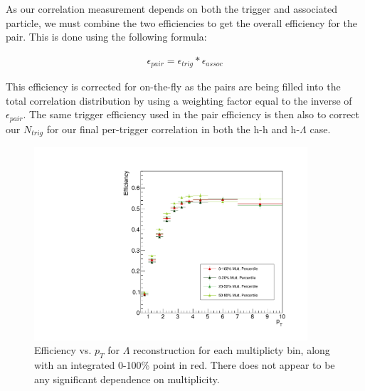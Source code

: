 \documentclass[ALICE,manyauthors]{ALICE_analysis_notes}
\begin{document}
As our correlation measurement depends on both the trigger and associated particle, we must combine the two efficiencies to get the overall efficiency for the pair.  This is done using the following formula:

\begin{align*}
    \epsilon_{pair} = \epsilon_{trig}*\epsilon_{assoc}
\end{align*}

This efficiency is corrected for on-the-fly as the pairs are being filled into the total correlation distribution by using a weighting factor equal to the inverse of $\epsilon_{pair}$. The same trigger efficiency used in the pair efficiency is then also to correct our $N_{trig}$ for our final per-trigger correlation in both the h-h and h-$\Lambda$ case.


\begin{figure}[ht]
\centering
\includegraphics[width=4in]{figures/v0_efficiency.pdf}
\caption{Efficiency vs. $p_T$ for $\Lambda$ reconstruction for each multiplicty bin, along with an integrated 0-100\% point in red. There does not appear to be any significant dependence on multiplicity.}
\label{lambda_eff}
\end{figure}
\end{document}
